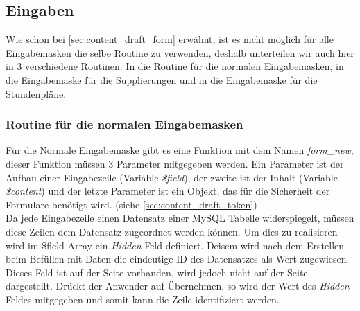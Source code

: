 \subsection{Eingaben}
%
%
%
% 
%
Wie schon bei \autoref{sec:content_draft_form} erwähnt, ist es nicht möglich für alle Eingabemasken die selbe Routine zu verwenden, deshalb unterteilen wir auch hier in 3 verschiedene Routinen. In die Routine für die normalen Eingabemasken, in die Eingabemaske für die Supplierungen und in die Eingabemaske für die Stundenpläne.
\subsubsection{Routine für die normalen Eingabemasken}
Für die Normale Eingabemaske gibt es eine Funktion mit dem Namen \textit{form\_new}, dieser Funktion müssen 3 Parameter mitgegeben werden. Ein Parameter ist der Aufbau einer Eingabezeile (Variable \textit{\$field}), der zweite ist der Inhalt (Variable \textit{\$content}) und der letzte Parameter ist ein Objekt, das für die Sicherheit der Formulare benötigt wird. (siehe \autoref{sec:content_draft_token})\\
Da jede Eingabezeile einen Datensatz einer MySQL Tabelle widerspiegelt,
müssen diese Zeilen dem Datensatz zugeordnet werden können. Um dies zu realisieren wird im \$field Array ein \textit{Hidden}-Feld definiert. Deisem wird nach dem Erstellen beim Befüllen mit Daten die eindeutige ID des Datensatzes als Wert zugewiesen. Dieses Feld ist auf der Seite vorhanden, wird jedoch nicht auf der Seite dargestellt. Drückt der Anwender auf Übernehmen, so wird der Wert des \textit{Hidden}-Feldes mitgegeben und somit kann die Zeile identifiziert werden.\\
